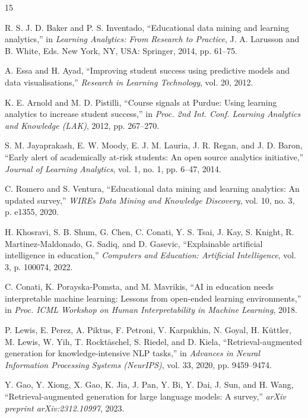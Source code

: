 \documentclass[conference]{IEEEtran}
\begin{document}

\begin{thebibliography}{15}

R. S. J. D. Baker and P. S. Inventado, ``Educational data mining and learning analytics,'' in \emph{Learning Analytics: From Research to Practice}, J. A. Larusson and B. White, Eds. New York, NY, USA: Springer, 2014, pp. 61--75.

A. Essa and H. Ayad, ``Improving student success using predictive models and data visualisations,'' \emph{Research in Learning Technology}, vol. 20, 2012.

K. E. Arnold and M. D. Pistilli, ``Course signals at Purdue: Using learning analytics to increase student success,'' in \emph{Proc. 2nd Int. Conf. Learning Analytics and Knowledge (LAK)}, 2012, pp. 267--270.

S. M. Jayaprakash, E. W. Moody, E. J. M. Lauria, J. R. Regan, and J. D. Baron, ``Early alert of academically at-risk students: An open source analytics initiative,'' \emph{Journal of Learning Analytics}, vol. 1, no. 1, pp. 6--47, 2014.

C. Romero and S. Ventura, ``Educational data mining and learning analytics: An updated survey,'' \emph{WIREs Data Mining and Knowledge Discovery}, vol. 10, no. 3, p. e1355, 2020.

H. Khosravi, S. B. Shum, G. Chen, C. Conati, Y. S. Tsai, J. Kay, S. Knight, R. Martinez-Maldonado, G. Sadiq, and D. Gasevic, ``Explainable artificial intelligence in education,'' \emph{Computers and Education: Artificial Intelligence}, vol. 3, p. 100074, 2022.

C. Conati, K. Porayska-Pomsta, and M. Mavrikis, ``AI in education needs interpretable machine learning: Lessons from open-ended learning environments,'' in \emph{Proc. ICML Workshop on Human Interpretability in Machine Learning}, 2018.

P. Lewis, E. Perez, A. Piktus, F. Petroni, V. Karpukhin, N. Goyal, H. K\"{u}ttler, M. Lewis, W. Yih, T. Rockt\"{a}schel, S. Riedel, and D. Kiela, ``Retrieval-augmented generation for knowledge-intensive NLP tasks,'' in \emph{Advances in Neural Information Processing Systems (NeurIPS)}, vol. 33, 2020, pp. 9459--9474.

Y. Gao, Y. Xiong, X. Gao, K. Jia, J. Pan, Y. Bi, Y. Dai, J. Sun, and H. Wang, ``Retrieval-augmented generation for large language models: A survey,'' \emph{arXiv preprint arXiv:2312.10997}, 2023.


\end{thebibliography}
\end{document}
